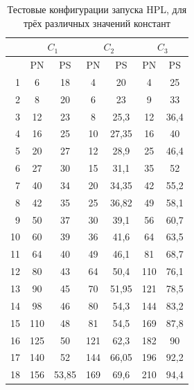 	\begin{table}
		\begin{tabular}{|r|c|c|c|c|c|c|}
		\hline
		& \multicolumn{2}{c|}{\(C_1\)} & \multicolumn{2}{c|}{\(C_2\)} & \multicolumn{2}{c|}{\(C_3\)} \\ \hline
		\textnumero & PN & PS & PN & PS & PN & PS \\ \hline
		1 & 6 & 18 & 4 & 20 & 4 & 25 \\ \hline
		2 & 8 & 20 & 6 & 23 & 9 & 33 \\ \hline
		3 & 12 & 23 & 8 & 25,3 & 12 & 36,4 \\ \hline
		4 & 16 & 25 & 10 & 27,35 & 16 & 40 \\ \hline
		5 & 20 & 27 & 12 & 28,9 & 25 & 46,4 \\ \hline
		6 & 27 & 30 & 15 & 31,1 & 35 & 52 \\ \hline
		7 & 40 & 34 & 20 & 34,35 & 42 & 55,2 \\ \hline
		8 & 42 & 35 & 25 & 36,82 & 49 & 58,1 \\ \hline
		9 & 50 & 37 & 30 & 39,1 & 56 & 60,7 \\ \hline
		10 & 60 & 39 & 36 & 41,6 & 64 & 63,5 \\ \hline
		11 & 64 & 40 & 49 & 46,1 & 81 & 68,7 \\ \hline
		12 & 80 & 43 & 64 & 50,4 & 110 & 76,1 \\ \hline
		13 & 90 & 45 & 70 & 51,95 & 121 & 78,5 \\ \hline
		14 & 98 & 46 & 80 & 54,3 & 144 & 83,2 \\ \hline
		15 & 110 & 48 & 81 & 54,5 & 169 & 87,8 \\ \hline
		16 & 125 & 50 & 121 & 62,3 & 182 & 90 \\ \hline
		17 & 140 & 52 & 144 & 66,05 & 196 & 92,2 \\ \hline
		18 & 156 & 53,85 & 169 & 69,6 & 210 & 94,4 \\ \hline
		\end{tabular}
		\caption{Тестовые конфигурации запуска HPL, для трёх различных значений констант}
		\label{test_HPL}
	\end{table}

